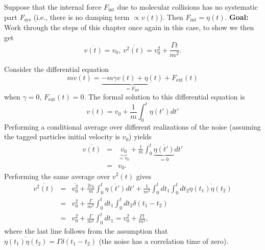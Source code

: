 
Suppose that the internal force $F_\text{int}$ due to molecular collisions has no systematic part $F_\text{sys}$ (i.e., there is no damping term $\propto v(t)$). Then $F_\text{int}=\eta(t)$. \textbf{Goal:} Work through the steps of this chapter once again in this case, to show we then get
\begin{equation}
\overline{v(t)} = v_0,~\overline{v^2(t)} = v_0^2 + \frac{\Gamma t}{m^2}.
\end{equation}

Consider the differential equation
\begin{equation}
m \dot{v}(t) = \underbrace{-m \gamma v(t) + \eta(t)}_{=F_\text{int}} + F_\text{ext}(t)
\end{equation}
when $\gamma=0$, $F_\text{ext}(t)=0$. The formal solution to this differential equation is
\begin{equation}
v(t) = v_0 + \frac{1}{m} \int_{0}^{t} \eta(t') dt'
\end{equation}
Performing a conditional average over different realizations of the noise (assuming the tagged particles initial velocity is $v_0$) yields
\begin{eqnarray}
\overline{v(t)}&=& \underbrace{\overline{v_0}}_{=v_0} + \frac{1}{m} \int_{0}^{t} \underbrace{\overline{\eta(t')}}_{=0} dt' \\
&=& v_0.
\end{eqnarray}
Performing the same average over $v^2(t)$ gives
\begin{eqnarray}
\overline{v^2(t)}&=& \overline{v_0^2} + \frac{2 v_0 }{m} \int_{0}^{t} \overline{\eta(t')} dt' + \frac{1}{m^2} \int_{0}^{t} dt_1 \int_{0}^{t} dt_2 \overline{\eta(t_1) \eta(t_2)}  \\
&=& v_0^2 + \frac{\Gamma}{m^2} \int_{0}^{t} dt_1 \int_{0}^{t} dt_2 \delta(t_1-t_2) \\
&=& \boxed{v_0^2 + \frac{\Gamma}{m^2} \int_{0}^{t} dt_1 = v_0^2 + \frac{\Gamma t}{m^2}},
\end{eqnarray}
where the last line follows from the assumption that $\overline{\eta(t_1) \eta(t_2)}=\Gamma \delta(t_1-t_2)$ (the noise has a correlation time of zero).